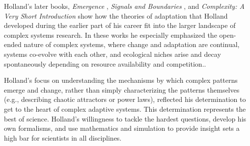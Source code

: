 \documentclass{sig-alternate}
\begin{document}





Holland's later books, \emph{Emergence} \cite{Holland2000},
\emph{Signals and Boundaries} \cite{Holland2012}, and
\emph{Complexity: A Very Short Introduction} \cite{Holland2014} show how the
theories of adaptation that Holland developed during the earlier part
of his career fit into the larger landscape of complex systems
research.  In these works he especially emphasized the open-ended
nature of complex systems, where change and adaptation are
continual, systems co-evolve with each other, and ecological niches arise
and decay spontaneously depending on resource availability and competition..


Holland's focus on understanding the mechanisms by which complex patterns emerge and change,
rather than simply characterizing the patterns themselves (e.g.,
describing chaotic attractors or power laws), reflected his
determination to get to the heart of complex adaptive systems.
This determination represents the best of science.  Holland's
willingness to tackle the hardest questions, develop his own
formalisms, and use mathematics and simulation to provide insight sets a high bar for
scientists in all disciplines.
\end{document}
